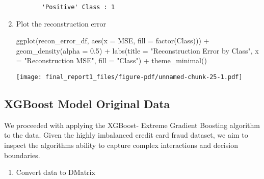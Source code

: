 \documentclass[
  11pt,
  letterpaper,
  DIV=11,
  numbers=noendperiod]{scrartcl}
\newenvironment{Shaded}{}{}
\newcommand{\AttributeTok}[1]{\textcolor[rgb]{0.84,0.23,0.29}{#1}}
\newcommand{\FloatTok}[1]{\textcolor[rgb]{0.00,0.36,0.77}{#1}}
\newcommand{\FunctionTok}[1]{\textcolor[rgb]{0.44,0.26,0.76}{#1}}
\newcommand{\NormalTok}[1]{\textcolor[rgb]{0.14,0.16,0.18}{#1}}
\newcommand{\SpecialCharTok}[1]{\textcolor[rgb]{0.00,0.36,0.77}{#1}}
\newcommand{\StringTok}[1]{\textcolor[rgb]{0.01,0.18,0.38}{#1}}
\providecommand{\tightlist}{%
  \setlength{\itemsep}{0pt}\setlength{\parskip}{0pt}}\usepackage{longtable,booktabs,array}
\begin{document}
\begin{enumerate}
\begin{verbatim}
       'Positive' Class : 1               
\end{verbatim}
\item
  Plot the reconstruction error

\begin{Shaded}
\begin{Highlighting}[]
\FunctionTok{ggplot}\NormalTok{(recon\_error\_df, }\FunctionTok{aes}\NormalTok{(}\AttributeTok{x =}\NormalTok{ MSE, }\AttributeTok{fill =} \FunctionTok{factor}\NormalTok{(Class))) }\SpecialCharTok{+}
  \FunctionTok{geom\_density}\NormalTok{(}\AttributeTok{alpha =} \FloatTok{0.5}\NormalTok{) }\SpecialCharTok{+}
  \FunctionTok{labs}\NormalTok{(}\AttributeTok{title =} \StringTok{"Reconstruction Error by Class"}\NormalTok{, }\AttributeTok{x =} \StringTok{"Reconstruction MSE"}\NormalTok{, }\AttributeTok{fill =} \StringTok{"Class"}\NormalTok{) }\SpecialCharTok{+}
  \FunctionTok{theme\_minimal}\NormalTok{()}
\end{Highlighting}
\end{Shaded}

  \texttt{[image: final\_report1\_files/figure-pdf/unnamed-chunk-25-1.pdf]}
\end{enumerate}

\subsection{XGBoost Model Original
Data}\label{xgboost-model-original-data}

We proceeded with applying the XGBoost- Extreme Gradient Boosting
algorithm to the data. Given the highly imbalanced credit card fraud
dataset, we aim to inspect the algorithms ability to capture complex
interactions and decision boundaries.

\begin{enumerate}
\def\labelenumi{\arabic{enumi}.}
\tightlist
\item
  Convert data to DMatrix
\end{enumerate}
\end{document}
